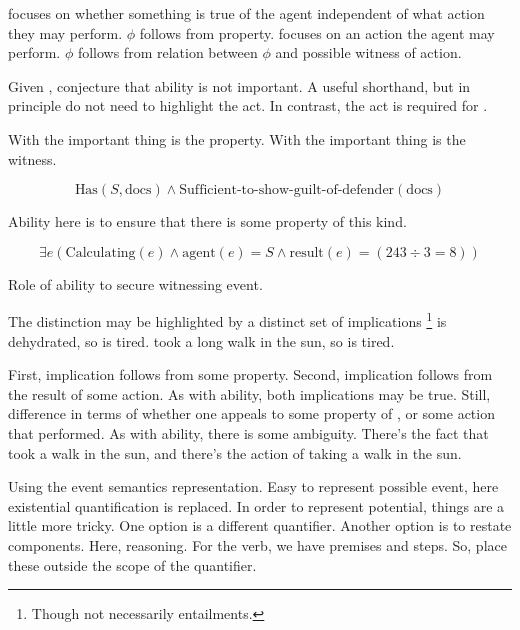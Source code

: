 \begin{note}[Difference]
  \AR{} focuses on whether something is true of the agent independent of what action they may perform.
  \(\phi\) follows from property.
  \WR{} focuses on an action the agent may perform.
  \(\phi\) follows from relation between \(\phi\) and possible witness of action.

  Given \AR{}, conjecture that ability is not important.
  A useful shorthand, but in principle do not need to highlight the act.
  In contrast, the act is required for \WR{}.

  With \AR{} the important thing is the property.
  With \WR{} the important thing is the witness.

  \[\text{Has}(S,\text{docs}) \land \text{Sufficient-to-show-guilt-of-defender}(\text{docs})\]

  Ability here is to ensure that there is some property of this kind.

  \[\exists e(\text{Calculating}(e) \land \text{agent}(e) = S \land \text{result}(e) = (243 \div 3 = 8))\]

  Role of ability to secure witnessing event.

  The distinction may be highlighted by a distinct set of implications\nolinebreak
  \footnote{
    Though not necessarily entailments.
  }
   is dehydrated, so  is tired.
   took a long walk in the sun, so  is tired.

  First, implication follows from some property.
  Second, implication follows from the result of some action.
  As with ability, both implications may be true.
  Still, difference in terms of whether one appeals to some property of , or some action that  performed.
  As with ability, there is some ambiguity.
  There's the fact that  took a walk in the sun, and there's the action of  taking a walk in the sun.
\end{note}

\begin{note}[More on \WR{}]
  \color{red}
  Using the event semantics representation.
  Easy to represent possible event, here existential quantification is replaced.
  In order to represent potential, things are a little more tricky.
  One option is a different quantifier.
  Another option is to restate components.
  Here, reasoning.
  For the verb, we have premises and steps.
  So, place these outside the scope of the quantifier.
\end{note}


